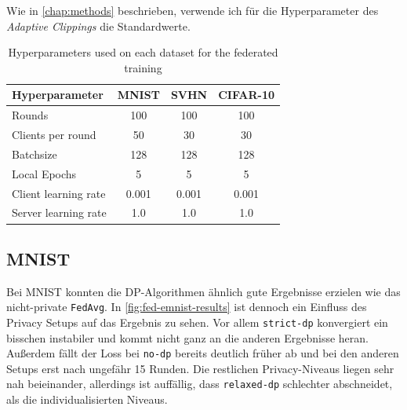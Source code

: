 Wie in \autoref{chap:methods} beschrieben, verwende ich für die Hyperparameter des \textit{Adaptive Clippings} die Standardwerte.

\begin{table}[tb]
	\centering
	\begin{tabular}{lccc}
		\toprule
		Hyperparameter & MNIST & SVHN & CIFAR-10 \\
		\midrule
		Rounds & 100 & 100 & 100 \\
		Clients per round & 50 & 30 & 30 \\
		Batchsize & 128 & 128 & 128 \\
		Local Epochs & 5 & 5 & 5 \\
		Client learning rate & 0.001 & 0.001 & 0.001 \\
		Server learning rate & 1.0 & 1.0 & 1.0 \\
		\bottomrule
	\end{tabular}
	\caption{Hyperparameters used on each dataset for the federated training}
	\label{tab:fl-hyperparameters}
\end{table}

\subsection{MNIST}

Bei MNIST konnten die DP-Algorithmen ähnlich gute Ergebnisse erzielen wie das nicht-private \texttt{FedAvg}. In \autoref{fig:fed-emnist-results} ist dennoch ein Einfluss des Privacy Setups auf das Ergebnis zu sehen. Vor allem \texttt{strict-dp} konvergiert ein bisschen instabiler und kommt nicht ganz an die anderen Ergebnisse heran. Außerdem fällt der Loss bei \texttt{no-dp} bereits deutlich früher ab und bei den anderen Setups erst nach ungefähr 15 Runden. Die restlichen Privacy-Niveaus liegen sehr nah beieinander, allerdings ist auffällig, dass \texttt{relaxed-dp} schlechter abschneidet, als die individualisierten Niveaus.

